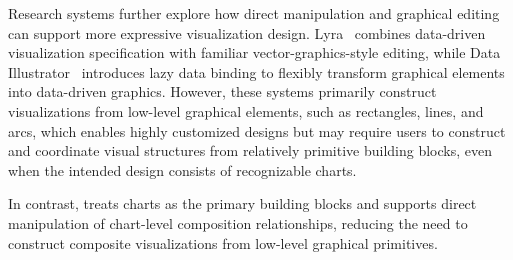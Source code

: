 Research systems further explore how direct manipulation and graphical editing
can support more expressive visualization design. Lyra~\cite{Lyra} combines
data-driven visualization specification with familiar vector-graphics-style
editing, while Data Illustrator~\cite{DataIllustrator} introduces lazy data
binding to flexibly transform graphical elements into data-driven graphics.
However, these systems primarily construct visualizations from low-level
graphical elements, such as rectangles, lines, and arcs, which enables highly
customized designs but may require users to construct and coordinate visual
structures from relatively primitive building blocks, even when the intended
design consists of recognizable charts.

In contrast, {\system} treats charts as the primary building blocks and
supports direct manipulation of chart-level composition relationships,
reducing the need to construct composite visualizations from low-level
graphical primitives.
